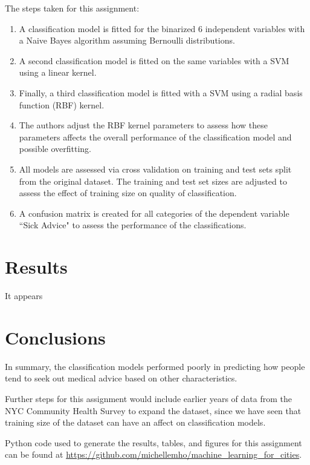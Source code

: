 \documentclass[10pt,twocolumn]{article}
\begin{document}
The steps taken for this assignment:

\begin{enumerate}
\item A classification model is fitted for the binarized 6 independent variables with
a Naive Bayes algorithm assuming Bernoulli distributions.
\item A second classification model is fitted on the same variables with
a SVM using a linear kernel.
\item Finally, a third classification model is fitted with a SVM using a radial basis
function (RBF) kernel.
\item The authors adjust the RBF kernel parameters to assess how these parameters
affects the overall performance of the classification model and possible overfitting.
\item All models are assessed via cross validation on training and test sets split
from the original dataset. The training and test set sizes are adjusted to assess the effect of training size on quality
of classification.
\item A confusion matrix is created for all categories of the dependent variable
``Sick Advice" to assess the performance of the classifications.
\end{enumerate}

\section{Results}

It appears

\section{Conclusions}

In summary, the classification models performed poorly in predicting
how people tend to seek out medical advice based on other characteristics.

Further steps for this assignment would include earlier years of data from the
NYC Community Health Survey to expand the dataset, since we have seen that training
size of the dataset can have an affect on classification models.

Python code used to generate the results, tables, and figures for this assignment can be
found at \url{https://github.com/michellemho/machine_learning_for_cities}.
\end{document}
